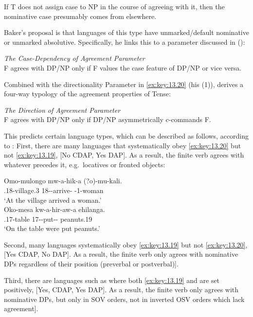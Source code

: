 \documentclass[output=paper]{langsci/langscibook}
\begin{document}
If T does not assign case to NP in the course of agreeing with it, then the
nominative case presumably comes from elsewhere.

Baker’s proposal is that languages of this type have unmarked/default
nominative or unmarked absolutive. Specifically, he links this to a parameter
discussed in \citeauthor{Baker2008} (\citeyear[155, (2)]{Baker2008}):

\ea%
    \label{ex:key:13.19}
    \emph{The Case-Dependency of Agreement Parameter}\\
    F agrees with DP/NP only if F values the case feature of DP/NP or vice
    versa.
\z

Combined with the directionality Parameter in \eqref{ex:key:13.20} (his (1)),
\citet{Baker2008} derives a four-way typology of the agreement properties of
Tense:

\ea\label{ex:key:13.20}
    \emph{The Direction of Agreement Parameter}\\
    F agrees with DP/NP only if DP/NP asymmetrically c-commands F.
\z

This predicts certain language types, which can be described as follows,
according to \citet{Baker2008}: First, there are many  languages
that systematically obey \eqref{ex:key:13.20} but not \eqref{ex:key:13.19}, [No
\gls{CDAP}, Yes \gls{DAP}]. As a result, the finite verb agrees with whatever
precedes it, e.g.\ locatives or fronted objects:\newpage

\ea%
    \label{ex:key:13.21} \citep[158]{Baker2008}
	\ea
	\gll  Omo-mulongo mw-a-hik-a (?o)-mu-kali.\\
    \Loc.18-village.3 18\Sm-\Tns-arrive-\Fv{} \Aug{}-1-woman\\
	\glt     ‘At the village arrived a woman.’\\
    \ex
    \gll Oko-mesa kw-a-hir-aw-a ehilanga.\\
    \Loc.17-table 17\Sm-\Tns-put-\Pass{}-\Fv{} peanuts.19\\
    \glt ‘On the table were put peanuts.’
    \z
\z

Second, many  languages systematically obey \eqref{ex:key:13.19} but
not \eqref{ex:key:13.20}, [Yes \gls{CDAP}, No \gls{DAP}]. As a result, the finite verb only
agrees with nominative DPs regardless of their position (preverbal or
postverbal)].

Third, there are languages such as  where both \eqref{ex:key:13.19} and
 are set positively, [Yes, \gls{CDAP}, Yes \gls{DAP}]. As a result, the
finite verb only agrees with nominative DPs, but only in SOV orders, not in
inverted OSV orders which lack agreement].
\end{document}

